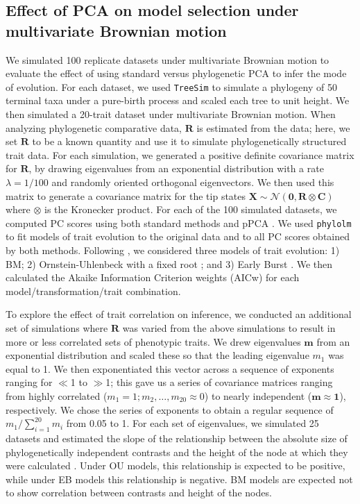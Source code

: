 \documentclass[a4paper,11pt]{article}
\begin{document}
\subsection{Effect of PCA on model selection under multivariate Brownian motion}
We simulated 100 replicate datasets under multivariate Brownian motion to evaluate the effect of using standard versus phylogenetic PCA to infer the mode of evolution. For each dataset, we used \texttt{TreeSim} \citep{treesim} to simulate a phylogeny of 50 terminal taxa under a pure-birth process and scaled each tree to unit height. We then simulated a 20-trait dataset under multivariate Brownian motion. When analyzing phylogenetic comparative data, $\mathbf{R}$ is estimated from the data; here, we set $\mathbf{R}$ to be a known quantity and use it to simulate phylogenetically structured trait data. For each simulation, we generated a positive definite covariance matrix for $\mathbf{R}$, by drawing eigenvalues from an exponential distribution with a rate $\lambda = \text{1/100}$ and randomly oriented orthogonal eigenvectors. We then used this matrix to generate a covariance matrix for the tip states 
$\mathbf{X}\sim \mathcal{N}(\mathbf{0}, \mathbf{R} \otimes \mathbf{C})$ where $\otimes$ is the Kronecker product.
For each of the 100 simulated datasets, we computed PC scores using both standard methods and pPCA \citep[using the \texttt{phytools} package;][]{phytools}. We used \texttt{phylolm} \citep{HoandAne2014} to fit models of trait evolution to the original data and to all PC scores obtained by both methods. Following \citet{Harmon2010}, we considered three models of trait evolution: 1) BM; 2) Ornstein-Uhlenbeck with a fixed root \citep[OU:][]{ Hansen1997}; and 3) Early Burst \citep[EB:][]{Blomberg2003, Harmon2010}. We then calculated the Akaike Information Criterion weights (AICw) for each model/transformation/trait combination.

To explore the effect of trait correlation on inference, we conducted an additional set of simulations where $\mathbf{R}$ was varied from the above simulations to result in more or less correlated sets of phenotypic traits. We drew eigenvalues $\mathbf{m}$ from an exponential distribution and scaled these so that the leading eigenvalue $m_{\text{1}}$ was equal to 1. We then exponentiated this vector across a sequence of exponents ranging for $\ll$1 to $\gg$1; this gave us a series of covariance matrices ranging from highly correlated ($m_{\text{1}} = \text{1}; m_{\text{2}}, \ldots, m_{\text{20}} \approx \text{0}$) to nearly independent ($\mathbf{m} \approx \textbf{1}$), respectively. We chose the series of exponents to obtain a regular sequence of $m_{\text{1}} / \sum_{i=\text{1}}^{\text{20}} m_i$ from 0.05 to 1. For each set of eigenvalues, we simulated 25 datasets and estimated the slope of the relationship between the absolute size of phylogenetically independent contrasts \citep{Felsenstein1985} and the height of the node at which they were calculated \citep[i.e., the ``node height test'' of][]{FreckletonHarvey2006}. Under OU models, this relationship is expected to be positive, while under EB models this relationship is negative. BM models are expected not to show correlation between contrasts and height of the nodes.
\end{document}
